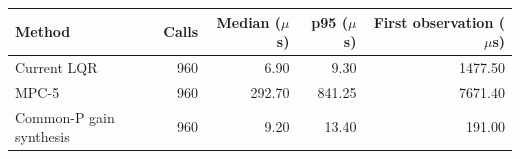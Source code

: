 \begin{tabular}{lrrrr}
\toprule
Method & Calls & Median ($\mu$s) & p95 ($\mu$s) & First observation ($\mu$s) \\
\midrule
Current LQR & 960 & 6.90 & 9.30 & 1477.50 \\
MPC-5 & 960 & 292.70 & 841.25 & 7671.40 \\
Common-P gain synthesis & 960 & 9.20 & 13.40 & 191.00 \\
\bottomrule
\end{tabular}
